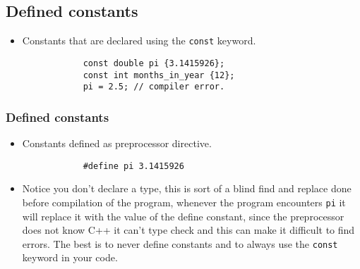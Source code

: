 \subsection{Defined constants}
\begin{itemize}
    \item Constants that are declared using the \texttt{const} keyword.
        \begin{verbatim}
            const double pi {3.1415926};
            const int months_in_year {12};
            pi = 2.5; // compiler error.
        \end{verbatim}
\end{itemize}

\subsubsection{Defined constants}
\begin{itemize}
    \item Constants defined as preprocessor directive. 
        \begin{verbatim}
            #define pi 3.1415926
        \end{verbatim}
    
    \item Notice you don't declare a type, this is sort of a blind find and replace done before compilation of the program, whenever the program encounters \texttt{pi} it will replace it with the value of the define constant, since the preprocessor does not know C++ it can't type check and this can make it difficult to find errors. The best is to never define constants and to always use the \texttt{const} keyword in your code.
\end{itemize}




